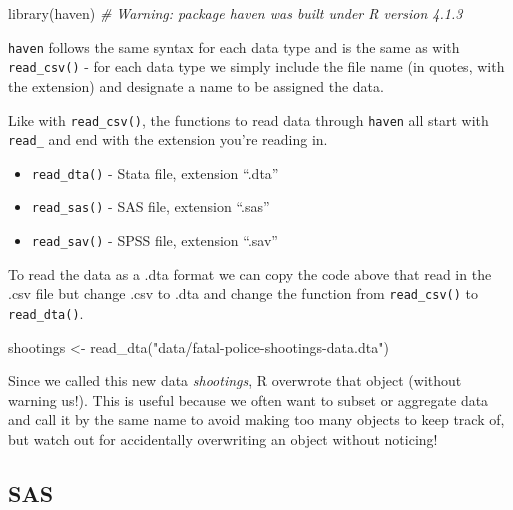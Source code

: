 \documentclass[
  a4paper,
]{krantz}
\makeatletter
\newenvironment{Shaded}{\begin{snugshade}}{\end{snugshade}}
\newcommand{\CommentTok}[1]{\textcolor[rgb]{0.37,0.37,0.37}{\textit{#1}}}
\newcommand{\FunctionTok}[1]{\textcolor[rgb]{0,0,0}{#1}}
\newcommand{\NormalTok}[1]{#1}
\newcommand{\OtherTok}[1]{\textcolor[rgb]{0.37,0.37,0.37}{#1}}
\newcommand{\StringTok}[1]{\textcolor[rgb]{0.5,0.5,0.5}{#1}}
\providecommand{\tightlist}{%
  \setlength{\itemsep}{0pt}\setlength{\parskip}{0pt}}
\newenvironment{kframe}{%
\medskip{}
\setlength{\fboxsep}{.8em}
 \def\at@end@of@kframe{}%
 \ifinner\ifhmode%
  \def\at@end@of@kframe{\end{minipage}}%
  \begin{minipage}{\columnwidth}%
 \fi\fi%
 \def\FrameCommand##1{\hskip\@totalleftmargin \hskip-\fboxsep
 \colorbox{shadecolor}{##1}\hskip-\fboxsep
     \hskip-\linewidth \hskip-\@totalleftmargin \hskip\columnwidth}%
 \MakeFramed {\advance\hsize-\width
   \@totalleftmargin\z@ \linewidth\hsize
   \@setminipage}}%
 {\par\unskip\endMakeFramed%
 \at@end@of@kframe}
\renewenvironment{Shaded}{\begin{kframe}}{\end{kframe}}
\makeatother
\begin{document}
\begin{Shaded}
\begin{Highlighting}[]
\FunctionTok{library}\NormalTok{(haven)}
\CommentTok{\# Warning: package \textquotesingle{}haven\textquotesingle{} was built under R version 4.1.3}
\end{Highlighting}
\end{Shaded}

\texttt{haven} follows the same syntax for each data type
and is the same as with \texttt{read\_csv()} - for each data
type we simply include the file name (in quotes, with the
extension) and designate a name to be assigned the data.

Like with \texttt{read\_csv()}, the functions to read data
through \texttt{haven} all start with \texttt{read\_} and
end with the extension you're reading in.

\begin{itemize}
\tightlist
\item
  \texttt{read\_dta()} - Stata file, extension ``.dta''
\item
  \texttt{read\_sas()} - SAS file, extension ``.sas''
\item
  \texttt{read\_sav()} - SPSS file, extension ``.sav''
\end{itemize}

To read the data as a .dta format we can copy the code above
that read in the .csv file but change .csv to .dta and
change the function from \texttt{read\_csv()} to
\texttt{read\_dta()}.

\begin{Shaded}
\begin{Highlighting}[]
\NormalTok{shootings }\OtherTok{\textless{}{-}} \FunctionTok{read\_dta}\NormalTok{(}\StringTok{"data/fatal{-}police{-}shootings{-}data.dta"}\NormalTok{)}
\end{Highlighting}
\end{Shaded}

Since we called this new data \emph{shootings}, R overwrote
that object (without warning us!). This is useful because we
often want to subset or aggregate data and call it by the
same name to avoid making too many objects to keep track of,
but watch out for accidentally overwriting an object without
noticing!

\hypertarget{sas}{%
\subsection{SAS}\label{sas}}
\end{document}
